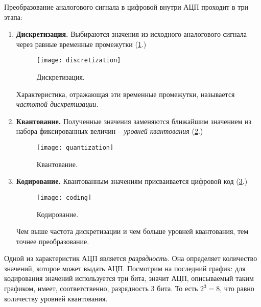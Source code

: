 \documentclass[../sparc.tex]{subfiles}
\begin{document}

Преобразование аналогового сигнала в цифровой внутри АЦП проходит в три этапа:
\begin{enumerate}

\item \textbf{Дискретизация.} Выбираются значения из исходного аналогового сигнала через
  равные временные промежутки (\ref{fig:discretization}.)

  \begin{figure}[h]
    \centering
    \texttt{[image: discretization]}
    \label{fig:discretization}
    \caption{Дискретизация.}
  \end{figure}

  Характеристика, отражающая эти временные промежутки, называется \emph{частотой
  дискретизации}.

\item \textbf{Квантование.} Полученные значения заменяются ближайшим значением из
  набора фиксированных величин -- \emph{уровней квантования}
  (\ref{fig:quantization}.)

  \begin{figure}[h]
    \caption{Квантование.}
    \label{fig:quantization}
    \texttt{[image: quantization]}
    \centering
  \end{figure}

\item \textbf{Кодирование.} Квантованным значениям присваивается цифровой код
  (\ref{fig:coding}.)

  \begin{figure}[h]
    \caption{Кодирование.}
    \label{fig:coding}
    \texttt{[image: coding]}
    \centering
  \end{figure}

  Чем выше частота дискретизации и чем больше уровней квантования, тем точнее
  преобразование.

\end{enumerate}

Одной из характеристик АЦП является \emph{разрядность}. Она определяет
количество значений, которое может выдать АЦП. Посмотрим на последний график:
для кодирования значений используется три бита, значит АЦП, описываемый таким
графиком, имеет, соответственно, разрядность 3 бита. То есть $ 2^3 = 8 $, что
равно количеству уровней квантования.
\end{document}
